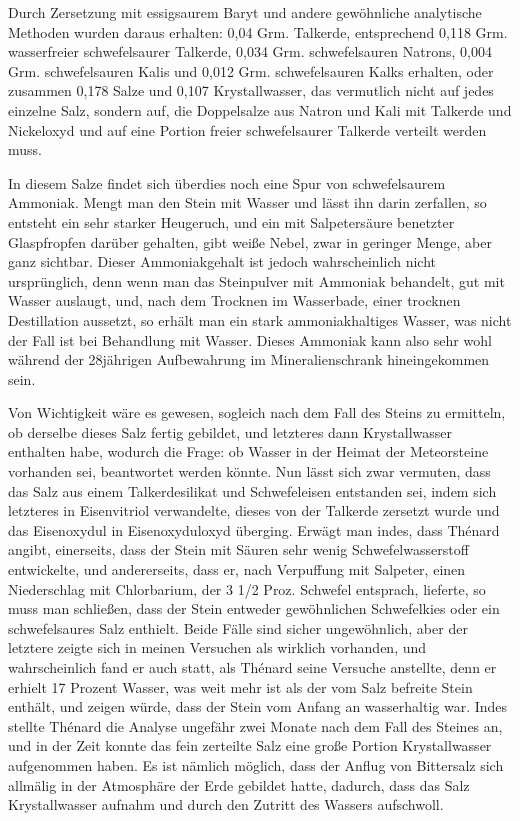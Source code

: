 \documentclass[a4paper, 11pt, oneside]{article}
\begin{document}
Durch Zersetzung mit essigsaurem Baryt und andere gewöhnliche analytische Methoden wurden daraus erhalten: 0,04 Grm. Talkerde, entsprechend 0,118 Grm. wasserfreier schwefelsaurer Talkerde, 0,034 Grm. schwefelsauren Natrons, 0,004 Grm. schwefelsauren Kalis und 0,012 Grm. schwefelsauren Kalks erhalten, oder zusammen 0,178 Salze und 0,107 Krystallwasser, das vermutlich nicht auf jedes einzelne Salz, sondern auf, die Doppelsalze aus Natron und Kali mit Talkerde und Nickeloxyd und auf eine Portion freier schwefelsaurer Talkerde verteilt werden muss.

In diesem Salze findet sich überdies noch eine Spur von schwefelsaurem Ammoniak. Mengt man den Stein mit Wasser und lässt ihn darin zerfallen, so entsteht ein sehr starker Heugeruch, und ein mit Salpetersäure benetzter Glaspfropfen darüber gehalten, gibt weiße Nebel, zwar in geringer Menge, aber ganz sichtbar. Dieser Ammoniakgehalt ist jedoch wahrscheinlich nicht ursprünglich, denn wenn man das Steinpulver mit Ammoniak behandelt, gut mit Wasser auslaugt, und, nach dem Trocknen im Wasserbade, einer trocknen Destillation aussetzt, so erhält man ein stark ammoniakhaltiges Wasser, was nicht der Fall ist bei Behandlung mit Wasser. Dieses Ammoniak kann also sehr wohl während der 28jährigen Aufbewahrung im Mineralienschrank hineingekommen sein.

Von Wichtigkeit wäre es gewesen, sogleich nach dem Fall des Steins zu ermitteln, ob derselbe dieses Salz fertig gebildet, und letzteres dann Krystallwasser enthalten habe, wodurch die Frage: ob Wasser in der Heimat der Meteorsteine vorhanden sei, beantwortet werden könnte. Nun lässt sich zwar vermuten, dass das Salz aus einem Talkerdesilikat und Schwefeleisen entstanden sei, indem sich letzteres in Eisenvitriol verwandelte, dieses von der Talkerde zersetzt wurde und das Eisenoxydul in Eisenoxyduloxyd überging. Erwägt man indes, dass Thénard angibt, einerseits, dass der Stein mit Säuren sehr wenig Schwefelwasserstoff entwickelte, und andererseits, dass er, nach Verpuffung mit Salpeter, einen Niederschlag mit Chlorbarium, der 3 1/2 Proz. Schwefel entsprach, lieferte, so muss man schließen, dass der Stein entweder gewöhnlichen Schwefelkies oder ein schwefelsaures Salz enthielt. Beide Fälle sind sicher ungewöhnlich, aber der letztere zeigte sich in meinen Versuchen als wirklich vorhanden, und wahrscheinlich fand er auch statt, als Thénard seine Versuche anstellte, denn er erhielt 17 Prozent Wasser, was weit mehr ist als der vom Salz befreite Stein enthält, und zeigen würde, dass der Stein vom Anfang an wasserhaltig war. Indes stellte Thénard die Analyse ungefähr zwei Monate nach dem Fall des Steines an, und in der Zeit konnte das fein zerteilte Salz eine große Portion Krystallwasser aufgenommen haben. Es ist nämlich möglich, dass der Anflug von Bittersalz sich allmälig in der Atmosphäre der Erde gebildet hatte, dadurch, dass das Salz Krystallwasser aufnahm und durch den Zutritt des Wassers aufschwoll.
\end{document}
